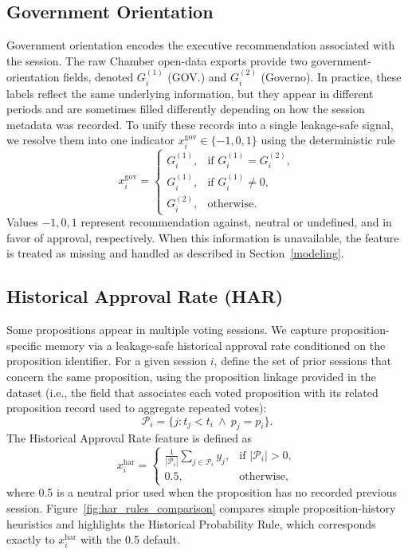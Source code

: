 \documentclass[review]{elsarticle}
\begin{document}
\subsection{Government Orientation}
\label{sec:gov_orientation}

Government orientation encodes the executive recommendation associated with the session. The raw Chamber open-data exports provide two government-orientation fields, denoted $G^{(1)}_i$ (GOV.) and $G^{(2)}_i$ (Governo). In practice, these labels reflect the same underlying information, but they appear in different periods and are sometimes filled differently depending on how the session metadata was recorded. To unify these records into a single leakage-safe signal, we resolve them into one indicator $x^{\mathrm{gov}}_i \in \{-1,0,1\}$ using the deterministic rule
\[
x^{\mathrm{gov}}_i =
\begin{cases}
G^{(1)}_i, & \text{if } G^{(1)}_i = G^{(2)}_i,\\
G^{(1)}_i, & \text{if } G^{(1)}_i \neq 0,\\
G^{(2)}_i, & \text{otherwise.}
\end{cases}
\]
Values $-1,0,1$ represent recommendation against, neutral or undefined, and in favor of approval, respectively. When this information is unavailable, the feature is treated as missing and handled as described in Section~\ref{modeling}.


\subsection{Historical Approval Rate (HAR)}
\label{sec:har}

Some propositions appear in multiple voting sessions. We capture proposition-specific memory via a leakage-safe historical approval rate conditioned on the proposition identifier. For a given session $i$, define the set of prior sessions that concern the same proposition, using the proposition linkage provided in the dataset (i.e., the field that associates each voted proposition with its related proposition record used to aggregate repeated votes):
\[
\mathcal{P}_i = \{ j : t_j < t_i \ \wedge \ p_j = p_i \}.
\]
The Historical Approval Rate feature is defined as
\[
x^{\mathrm{har}}_i =
\begin{cases}
\frac{1}{|\mathcal{P}_i|}\sum\limits_{j \in \mathcal{P}_i} y_j, & \text{if } |\mathcal{P}_i| > 0,\\
0.5, & \text{otherwise,}
\end{cases}
\]
where 0.5 is a neutral prior used when the proposition has no recorded previous session. Figure~\ref{fig:har_rules_comparison} compares simple proposition-history heuristics and highlights the Historical Probability Rule, which corresponds exactly to $x^{\mathrm{har}}_i$ with the 0.5 default.
\end{document}
